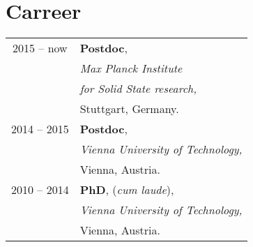 \documentclass[11pt,sans]{moderncv} %
\begin{document}
\thispagestyle{empty}
\makecvtitle %






\section{Carreer}
\begin{minipage}{0.35\textwidth}
\begin{tabular}{@{\hskip 0.2 cm} c@{\hskip 0.75cm} l}
2015 -- now & \textbf{Postdoc}, \\ & \textit{Max Planck Institute} \\ 
& \textit{for Solid State research,} \\ 
& Stuttgart, Germany. \vspace{0.5cm} \\	


2014 -- 2015 & \textbf{Postdoc}, \\
          & \textit{Vienna University of Technology,} \\ 
          & Vienna, Austria. \vspace{0.5cm} \\
          
2010 -- 2014 & \textbf{PhD}, (\textit{cum laude}), \\
	  & \textit{Vienna University of Technology,} \\ 
          & Vienna, Austria. \\

\end{tabular}
 
\end{minipage}
\end{document}
